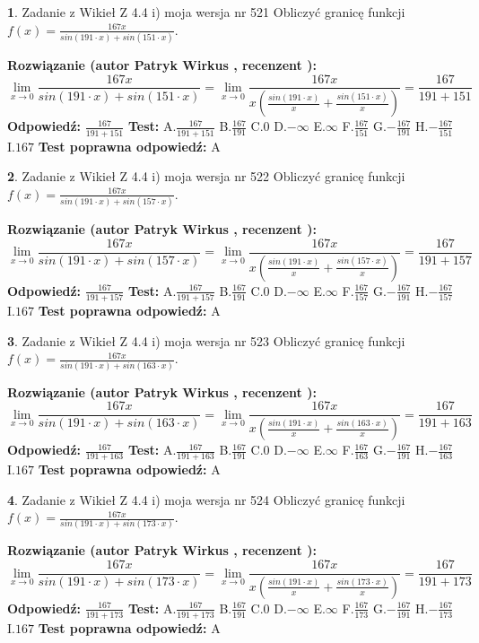\documentclass[12pt, a4paper]{article}
\theoremstyle{definition} %
\newtheorem{zad}{}
\newcommand{\zadStart}[1]{\begin{zad}#1\newline}
\newcommand{\zadStop}{\end{zad}}
\newcommand{\rozwStart}[2]{\noindent \textbf{Rozwiązanie (autor #1 , recenzent #2): }\newline}
\newcommand{\rozwStop}{\newline}
\newcommand{\odpStart}{\noindent \textbf{Odpowiedź:}\newline}
\newcommand{\odpStop}{\newline}
\newcommand{\testStart}{\noindent \textbf{Test:}\newline}
\newcommand{\testStop}{\newline}
\newcommand{\kluczStart}{\noindent \textbf{Test poprawna odpowiedź:}\newline}
\newcommand{\kluczStop}{\newline}
\begin{document}
\zadStart{Zadanie z Wikieł Z 4.4 i) moja wersja nr 521}
Obliczyć granicę funkcji $f(x)=\frac{167x}{sin(191\cdot x) +sin(151\cdot x)}$.
\zadStop
\rozwStart{Patryk Wirkus}{}
$$\lim\limits_{x\to 0}\frac{167x}{sin(191\cdot x) +sin(151\cdot x)}=\lim\limits_{x\to 0}\frac{167x}{x(\frac{sin(191\cdot x)}{x}+\frac{sin(151\cdot x)}{x})}=\frac{167}{191+151}$$
\rozwStop
\odpStart
$\frac{167}{191+151}$
\odpStop
\testStart
A.$\frac{167}{191+151}$
B.$\frac{167}{191}$
C.$0$
D.$-\infty$
E.$\infty$
F.$\frac{167}{151}$
G.$-\frac{167}{191}$
H.$-\frac{167}{151}$
I.$167$
\testStop
\kluczStart
A
\kluczStop



\zadStart{Zadanie z Wikieł Z 4.4 i) moja wersja nr 522}
Obliczyć granicę funkcji $f(x)=\frac{167x}{sin(191\cdot x) +sin(157\cdot x)}$.
\zadStop
\rozwStart{Patryk Wirkus}{}
$$\lim\limits_{x\to 0}\frac{167x}{sin(191\cdot x) +sin(157\cdot x)}=\lim\limits_{x\to 0}\frac{167x}{x(\frac{sin(191\cdot x)}{x}+\frac{sin(157\cdot x)}{x})}=\frac{167}{191+157}$$
\rozwStop
\odpStart
$\frac{167}{191+157}$
\odpStop
\testStart
A.$\frac{167}{191+157}$
B.$\frac{167}{191}$
C.$0$
D.$-\infty$
E.$\infty$
F.$\frac{167}{157}$
G.$-\frac{167}{191}$
H.$-\frac{167}{157}$
I.$167$
\testStop
\kluczStart
A
\kluczStop



\zadStart{Zadanie z Wikieł Z 4.4 i) moja wersja nr 523}
Obliczyć granicę funkcji $f(x)=\frac{167x}{sin(191\cdot x) +sin(163\cdot x)}$.
\zadStop
\rozwStart{Patryk Wirkus}{}
$$\lim\limits_{x\to 0}\frac{167x}{sin(191\cdot x) +sin(163\cdot x)}=\lim\limits_{x\to 0}\frac{167x}{x(\frac{sin(191\cdot x)}{x}+\frac{sin(163\cdot x)}{x})}=\frac{167}{191+163}$$
\rozwStop
\odpStart
$\frac{167}{191+163}$
\odpStop
\testStart
A.$\frac{167}{191+163}$
B.$\frac{167}{191}$
C.$0$
D.$-\infty$
E.$\infty$
F.$\frac{167}{163}$
G.$-\frac{167}{191}$
H.$-\frac{167}{163}$
I.$167$
\testStop
\kluczStart
A
\kluczStop



\zadStart{Zadanie z Wikieł Z 4.4 i) moja wersja nr 524}
Obliczyć granicę funkcji $f(x)=\frac{167x}{sin(191\cdot x) +sin(173\cdot x)}$.
\zadStop
\rozwStart{Patryk Wirkus}{}
$$\lim\limits_{x\to 0}\frac{167x}{sin(191\cdot x) +sin(173\cdot x)}=\lim\limits_{x\to 0}\frac{167x}{x(\frac{sin(191\cdot x)}{x}+\frac{sin(173\cdot x)}{x})}=\frac{167}{191+173}$$
\rozwStop
\odpStart
$\frac{167}{191+173}$
\odpStop
\testStart
A.$\frac{167}{191+173}$
B.$\frac{167}{191}$
C.$0$
D.$-\infty$
E.$\infty$
F.$\frac{167}{173}$
G.$-\frac{167}{191}$
H.$-\frac{167}{173}$
I.$167$
\testStop
\kluczStart
A
\kluczStop
\end{document}

